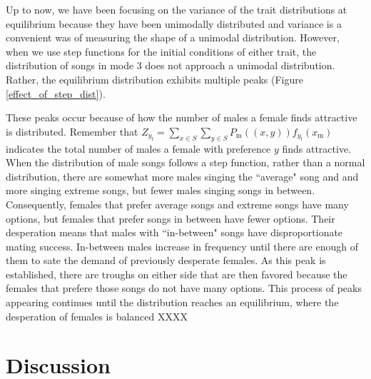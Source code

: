 \documentclass{article}
\newcommand{\x}[1]{\text{#1}}
\begin{document}
Up to now, we have been focusing on the variance of the trait distributions at equilibrium because they have been unimodally distributed and variance is a convenient was of measuring the shape of a unimodal distribution. However, when we use step functions for the initial conditions of either trait, the distribution of songs in mode $3$ does not approach a unimodal distribution. Rather, the equilibrium distribution exhibits multiple peaks (Figure \ref{effect_of_step_dist}). 

These peaks occur because of how the number of males a female finds attractive is distributed. Remember that $Z_{y_\x{f}}=\sum_{x\in S}\sum_{y\in S}P_\x{m}((x,y))f_{y_\x{f}}(x_\x{m})$ indicates the total number of males a female with preference $y$ finds attractive. When the distribution of male songs follows a step function, rather than a normal distribution, there are somewhat more males singing the ``average" song and and more singing extreme songs, but fewer males singing songs in between. Consequently, females that prefer average songs and extreme songs have many options, but females that prefer songs in between have fewer options. Their desperation means that males with ``in-between" songs have disproportionate mating success. In-between males increase in frequency until there are enough of them to sate the demand of previously desperate females. As this peak is established, there are troughs on either side that are then favored because the females that prefere those songs do not have many options. This process of peaks appearing continues until the distribution reaches an equilibrium, where the desperation of females is balanced XXXX

\section*{Discussion}

\end{document}
